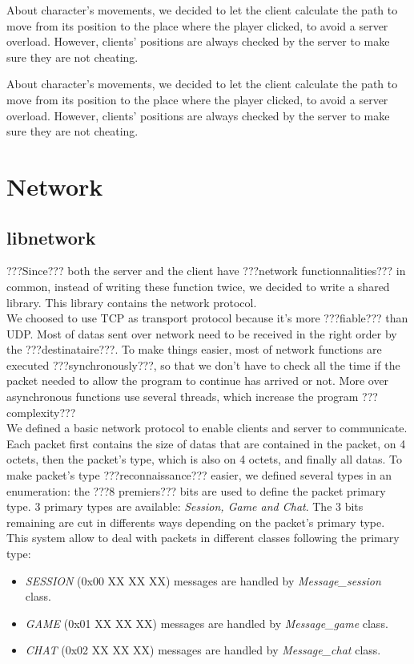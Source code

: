 \documentclass{scrreprt}
\begin{document}
				About character's movements, we decided to let the client calculate the path to move from its position to the place where the player clicked, to avoid a server overload. However, clients' positions are always checked by the server to make sure they are not cheating.

			About character's movements, we decided to let the client calculate the path to move from its position to the place where the player clicked, to avoid a server overload. However, clients' positions are always checked by the server to make sure they are not cheating.

			\chapter{Network}
			\section{libnetwork}
			???Since??? both the server and the client have ???network functionnalities??? in common, instead of writing these function twice, we decided to write a shared library. This library contains the network protocol.\\

				We choosed to use TCP as transport protocol because it's more ???fiable??? than UDP. Most of datas sent over network need to be received in the right order by the ???destinataire???. To make things easier, most of network functions are executed ???synchronously???, so that we don't have to check all the time if the packet needed to allow the program to continue has arrived or not. More over asynchronous functions use several threads, which increase the program ???complexity???\\

				We defined a basic network protocol to enable clients and server to communicate. Each packet first contains the size of datas that are contained in the packet, on 4 octets, then the packet's type, which is also on 4 octets, and finally all datas. To make packet's type ???reconnaissance??? easier, we defined several types in an enumeration: the ???8 premiers??? bits are used to define the packet primary type. 3 primary types are available: \emph{Session, Game and Chat}. The 3 bits remaining are cut in differents ways depending on the packet's primary type. This system allow to deal with packets in different classes following the primary type:
				\begin{itemize}
				\item{\emph{SESSION} (0x00 XX XX XX) messages are handled by \emph{Message\_session} class.}
				\item{\emph{GAME} (0x01 XX XX XX) messages are handled by \emph{Message\_game} class.}
				\item{\emph{CHAT} (0x02 XX XX XX) messages are handled by \emph{Message\_chat} class.}
				\end{itemize}
\end{document}

